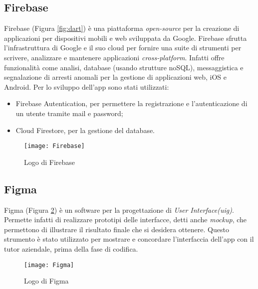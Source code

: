 \subsection{Firebase}
Firebase (Figura \ref{fig:dart}) è una piattaforma \emph{open-source} per la creazione di applicazioni per dispositivi mobili e web sviluppata da Google.\newline
Firebase sfrutta l'infrastruttura di Google e il suo cloud per fornire una suite di strumenti per scrivere, analizzare e mantenere applicazioni \emph{cross-platform}.\newline
Infatti offre funzionalità come analisi, database (usando strutture noSQL), messaggistica e segnalazione di arresti anomali per la gestione di applicazioni web, iOS e Android.\newline
Per lo sviluppo dell'app sono stati utilizzati:
\begin{itemize}
    \item Firebase Autentication, per permettere la registrazione e l'autenticazione di un utente tramite mail e password;
    \item Cloud Firestore, per la gestione del database.
\end{itemize}
\begin{figure}[!h] 
    \centering 
    \texttt{[image: Firebase]} 
    \caption{Logo di Firebase}\label{fig:figma}
\end{figure}

\subsection{Figma}
Figma (Figura \ref{fig:figma}) è un software per la progettazione di \emph{User Interface(\gls{uig})}.\newline
Permette infatti di realizzare prototipi delle interfacce, detti anche \emph{mockup}, che permettono di illustrare il risultato finale che si desidera ottenere.\newline
Questo strumento è stato utilizzato per mostrare e concordare l'interfaccia dell'app con il tutor aziendale, prima della fase di codifica.\newline
\begin{figure}[!h] 
    \centering 
    \texttt{[image: Figma]} 
    \caption{Logo di Figma}\label{fig:figma}
\end{figure}

